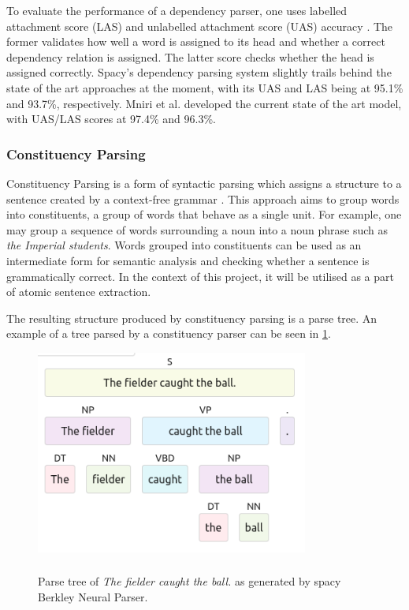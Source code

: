 To evaluate the performance of a dependency parser, one uses labelled attachment score (LAS) and unlabelled attachment score (UAS) accuracy \cite{RefWorks:RefID:28-jurafsky2014speech}.
The former validates how well a word is assigned to its head and whether a correct dependency relation is assigned.
The latter score checks whether the head is assigned correctly.
Spacy's dependency parsing system slightly trails behind the state of the art approaches at the moment, with its UAS and LAS being at 95.1\% and 93.7\%, respectively. 
Mniri et al. \cite{RefWorks:RefID:29-mrini2019rethinking} developed the current state of the art model, with UAS/LAS scores at 97.4\% and 96.3\%.

\subsubsection{Constituency Parsing}

Constituency Parsing is a form of syntactic parsing which assigns a structure to a sentence created by a context-free grammar \cite{RefWorks:RefID:28-jurafsky2014speech}.
This approach aims to group words into constituents, a group of words that behave as a single unit.
For example, one may group a sequence of words surrounding a noun into a noun phrase such as \emph{the Imperial students}.
Words grouped into constituents can be used as an intermediate form for semantic analysis and checking whether a sentence is grammatically correct.
In the context of this project, it will be utilised as a part of atomic sentence extraction.


The resulting structure produced by constituency parsing is a parse tree. 
An example of a tree parsed by a constituency parser can be seen in \ref{constituency-graph}.

\begin{figure}[h]
\caption{Parse tree of \emph{The fielder caught the ball.} as generated by spacy Berkley Neural Parser.}
\centering
\includegraphics[width=0.8\textwidth]{background/constituency parse.png}
\label{constituency-graph}
\end{figure}

